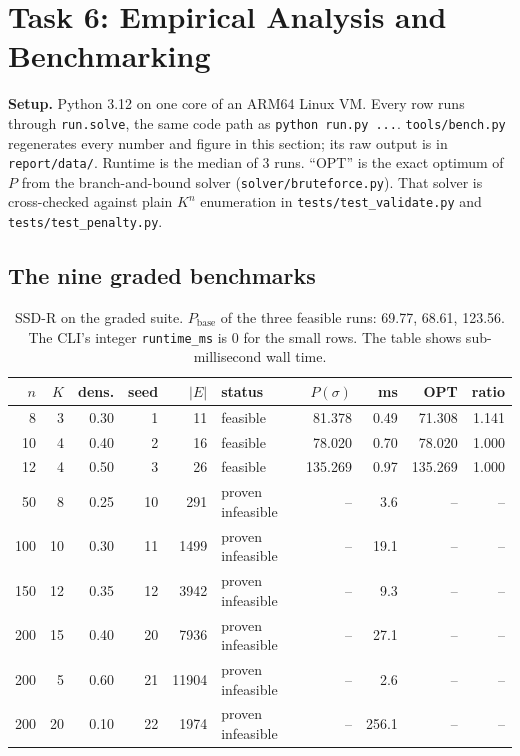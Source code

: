 \section{Task 6: Empirical Analysis and Benchmarking}

\textbf{Setup.} Python 3.12 on one core of an ARM64 Linux VM. Every row runs
through \texttt{run.solve}, the same code path as \texttt{python run.py
...}. \texttt{tools/bench.py} regenerates every number and figure in this
section; its raw output is in \texttt{report/data/}. Runtime is the median
of 3 runs. ``OPT'' is the exact optimum of $P$ from the branch-and-bound
solver (\texttt{solver/bruteforce.py}). That solver is cross-checked against
plain $K^n$ enumeration in \texttt{tests/test\_validate.py} and
\texttt{tests/test\_penalty.py}.

\subsection{The nine graded benchmarks}
\begin{table}[h]
\centering\small
\begin{tabular}{rrrrr l rrrr}
\toprule
$n$ & $K$ & dens. & seed & $|E|$ & status & $P(\sigma)$ & ms & OPT & ratio\\
\midrule
8   & 3  & 0.30 & 1  & 11    & feasible           & 81.378  & 0.49  & 71.308  & 1.141\\
10  & 4  & 0.40 & 2  & 16    & feasible           & 78.020  & 0.70  & 78.020  & 1.000\\
12  & 4  & 0.50 & 3  & 26    & feasible           & 135.269 & 0.97  & 135.269 & 1.000\\
50  & 8  & 0.25 & 10 & 291   & proven infeasible  & --      & 3.6   & --      & --\\
100 & 10 & 0.30 & 11 & 1499  & proven infeasible  & --      & 19.1  & --      & --\\
150 & 12 & 0.35 & 12 & 3942  & proven infeasible  & --      & 9.3   & --      & --\\
200 & 15 & 0.40 & 20 & 7936  & proven infeasible  & --      & 27.1  & --      & --\\
200 & 5  & 0.60 & 21 & 11904 & proven infeasible  & --      & 2.6   & --      & --\\
200 & 20 & 0.10 & 22 & 1974  & proven infeasible  & --      & 256.1 & --      & --\\
\bottomrule
\end{tabular}
\caption{SSD-R on the graded suite. $P_{\text{base}}$ of the three feasible
runs: 69.77, 68.61, 123.56. The CLI's integer \texttt{runtime\_ms} is 0 for
the small rows. The table shows sub-millisecond wall time.}
\end{table}


